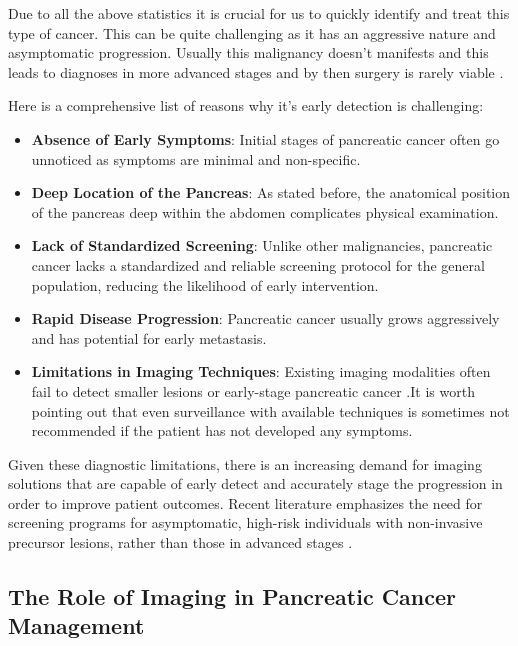 \documentclass[11pt]{article} %
\begin{document}
Due to all the above statistics it is crucial for us to quickly identify and treat this type of cancer. This can be quite challenging as it has an aggressive nature and asymptomatic progression. Usually this malignancy doesn't manifests and this leads to diagnoses in more advanced stages and by then surgery is rarely viable \cite{Pubmed30721664}.

Here is a comprehensive list of reasons why it's early detection is challenging:
\begin{itemize}
    \item \textbf{Absence of Early Symptoms}: Initial stages of pancreatic cancer often go unnoticed as symptoms are minimal and non-specific.
    \item \textbf{Deep Location of the Pancreas}: As stated before, the anatomical position of the pancreas deep within the abdomen complicates physical examination.
    \item \textbf{Lack of Standardized Screening}: Unlike other malignancies, pancreatic cancer lacks a standardized and reliable screening protocol for the general population, reducing the likelihood of early intervention.
    \item \textbf{Rapid Disease Progression}: Pancreatic cancer usually grows aggressively and has potential for early metastasis.
    \item \textbf{Limitations in Imaging Techniques}: Existing imaging modalities often fail to detect smaller lesions or early-stage pancreatic cancer \cite{Pubmed30721664}.It is worth pointing out that even surveillance with available techniques is sometimes not recommended if the patient has not developed any symptoms.
\end{itemize}


Given these diagnostic limitations, there is an increasing demand for imaging solutions that are capable of early detect and accurately stage the progression in order to improve patient outcomes. Recent literature emphasizes the need for screening programs for asymptomatic, high-risk individuals with non-invasive precursor lesions, rather than those in advanced stages \cite{Cancers2023}.

\subsection{The Role of Imaging in Pancreatic Cancer Management}
\end{document}
